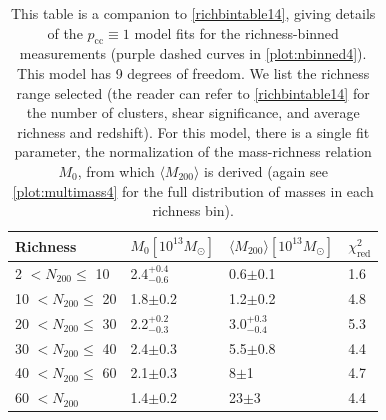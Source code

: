 \begin{landscape}
\begin{table}
\centering
    \caption[Shear Results for Richness-Binned Clusters (Perfectly Centered Model)]{This table is a companion to \autoref{richbintable14}, giving details of the $p_{\mathrm{cc}} \equiv 1$ model fits for the richness-binned measurements (purple dashed curves in \autoref{plot:nbinned4}). This model has 9 degrees of freedom. We list the richness range selected (the reader can refer to \autoref{richbintable14} for the number of clusters, shear significance, and average richness and redshift). For this model, there is a single fit parameter, the normalization of the mass-richness relation $M_0$, from which $\langle M_{200} \rangle$ is derived (again see \autoref{plot:multimass4} for the full distribution of masses in each richness bin).}
    \begin{tabular}{llll}
      \hline
      Richness & $M_0 \left[ 10^{13} M_{\odot}\right]$ & $\langle M_{200} \rangle \left[ 10^{13} M_{\odot}\right]$ & $\chi^2_{\mathrm{red}}$ \\ \hline
      2 $<N_{200}\leq$ 10 & 2.4$^{+0.4}_{-0.6}$ & 0.6$\pm$0.1 & 1.6  \\
      10 $<N_{200}\leq$ 20 & 1.8$\pm$0.2 & 1.2$\pm$0.2 & 4.8  \\
      20 $<N_{200}\leq$ 30 & 2.2$^{+0.2}_{-0.3}$ & 3.0$^{+0.3}_{-0.4}$ & 5.3  \\
      30 $<N_{200}\leq$ 40 & 2.4$\pm$0.3 & 5.5$\pm$0.8 & 4.4  \\
      40 $<N_{200}\leq$ 60 & 2.1$\pm$0.3 & 8$\pm$1 & 4.7  \\
      60 $<N_{200}$ & 1.4$\pm$0.2 & 23$\pm$3 & 4.4  \\
      \hline
    \end{tabular}
\label{richbintable24}
\end{table}


\end{landscape}
